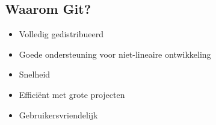 \documentclass[]{beamer}
\begin{document}


\subsection{Waarom Git?}

\begin{frame}
    \begin{itemize}
        \item Volledig gedistribueerd
        \item Goede ondersteuning voor niet-lineaire ontwikkeling
        \item Snelheid
        \item Efficiënt met grote projecten
        \item Gebruikersvriendelijk
    \end{itemize}
\end{frame}
\end{document}
